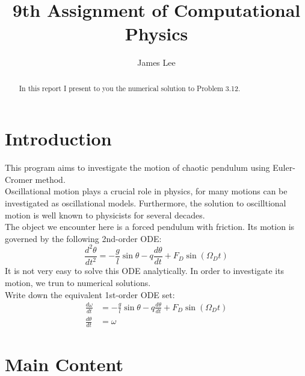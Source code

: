 \documentclass[10pt,a4paper]{article}
\author{James Lee}
\title{9th Assignment of Computational Physics}
\begin{document}
	\maketitle
	\begin{abstract}
		In this report I present to you the numerical solution to Problem 3.12.
	\end{abstract}
	\section{Introduction}
	This program aims to investigate the motion of chaotic pendulum using Euler-Cromer method.\\
	Oscillational motion plays a crucial role in physics, for many motions can be investigated as oscillational models. Furthermore, the solution to oscilltional motion is well known to physicists for several decades.\\
	The object we encounter here is a forced pendulum with friction. Its motion is governed by the following 2nd-order ODE:
	\begin{equation}
	\frac{d^{2}\theta}{dt^2}=-\frac{g}{l}\sin{\theta}-q\frac{d\theta}{dt}+F_{D}\sin{(\Omega_Dt)}
	\end{equation}
	It is not very easy to solve this ODE analytically. In order to investigate its motion, we trun to numerical solutions.\\
	Write down the equivalent 1st-order ODE set:
	\begin{align}	
	\frac{d\omega}{dt}&=-\frac{g}{l}\sin{\theta}-q\frac{d\theta}{dt}+F_{D}\sin{(\Omega_Dt)}\\
	\frac{d\theta}{dt}&=\omega	
	\end{align}
    \section{Main Content}
\end{document}
